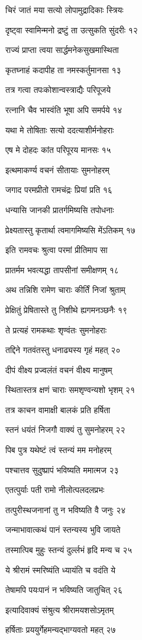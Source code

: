 चिरं जातं मया सत्यो लोपामुद्रादिकाः स्त्रियः

दृष्ट्वा स्वामिन्मनो द्रष्टुं ता उत्सुकति सुंदरीः १२

राज्यं प्राप्ता त्वया सार्द्धमनेकसुखमास्थिता

कृतघ्नाहं कदापीह ता नमस्कर्तुमानसा १३

तत्र गत्वा तपःकोशान्वस्त्राद्यैः परिपूजये

रत्नानि चैव भास्वंति भूषा अपि समर्पये १४

यथा मे तोषिताः सत्यो ददत्याशीर्मनोहराः

एष मे दोहदः कांत परिपूरय मानसः १५

इत्थमाकर्ण्य वचनं सीतायाः सुमनोहरम्

जगाद परमप्रीतो रामचंद्रः प्रियां प्रति १६

धन्यासि जानकी प्रातर्गमिष्यसि तपोधनाः

प्रेक्ष्यतास्तु कृतार्था त्वमागमिष्यसि मेंऽतिकम् १७

इति रामवचः श्रुत्वा परमां प्रीतिमाप सा

प्रातर्मम भवत्यद्धा तापसीनां समीक्षणम् १८

अथ तन्निशि रामेण चाराः कीर्तिं निजां श्रुताम्

प्रेक्षितुं प्रेषितास्ते तु निशीथे ह्यगमनञ्छनैः १९

ते प्रत्यहं रामकथाः शृण्वंतः सुमनोहराः

तद्दिने गतवंतस्तु धनाढ्यस्य गृहं महत् २०

दीपं वीक्ष्य प्रज्वलंतं वचनं वीक्ष्य मानुषम्

स्थितास्तत्र क्षणं चाराः समशृण्वन्यशो भृशम् २१

तत्र काचन वामाक्षी बालकं प्रति हर्षिता

स्तनं धयंतं निजगौ वाक्यं तु सुमनोहरम् २२

पिब पुत्र यथेष्टं त्वं स्तन्यं मम मनोहरम्

पश्चात्तव सुदुष्प्रापं भविष्यति ममात्मज २३

एतत्पुर्याः पती रामो नीलोत्पलदलप्रभः

तत्पुरीस्थजनानां तु न भविष्यति वै जनुः २४

जन्माभावात्कथं पानं स्तन्यस्य भुवि जायते

तस्मात्पिब मुहुः स्तन्यं दुर्ल्लभं हृदि मन्य च २५

ये श्रीरामं स्मरिष्यंति ध्यायंति च वदंति ये

तेषामपि पयःपानं न भविष्यति जातुचित् २६

इत्यादिवाक्यं संश्रुत्य श्रीरामयशसोऽमृतम्

हर्षिताः प्रययुर्गेहमन्यद्भाग्यवतो महत् २७

